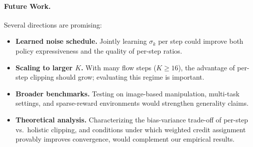 \paragraph{Future Work.}
Several directions are promising:
\begin{itemize}[nosep,leftmargin=*]
  \item \textbf{Learned noise schedule.}  Jointly learning $\sigma_k$ per step
        could improve both policy expressiveness and the quality of per-step
        ratios.
  \item \textbf{Scaling to larger $K$.}  With many flow steps ($K \geq 16$),
        the advantage of per-step clipping should grow; evaluating this regime
        is important.
  \item \textbf{Broader benchmarks.}  Testing on image-based manipulation,
        multi-task settings, and sparse-reward environments would strengthen
        generality claims.
  \item \textbf{Theoretical analysis.}  Characterizing the bias-variance
        trade-off of per-step vs.\ holistic clipping, and conditions under
        which weighted credit assignment provably improves convergence, would
        complement our empirical results.
\end{itemize}
